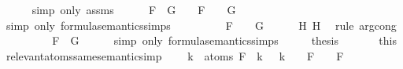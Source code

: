 \begin{isabellebody}
\ \ \ \ \isamarkupfalse%
\ {\isacharparenleft}simp\ only{\isacharcolon}\ assms{\isacharparenleft}{}{\isacharparenright}{\isacharparenright}\isanewline
\ \ \isamarkupfalse%
\ {\isachardoublequoteopen}{\isasymA}\ {\isasymTurnstile}\ F\ \isactrlbold {\isasymor}\ G\ {\isacharequal}\ {\isacharparenleft}{\isasymA}\ {\isasymTurnstile}\ F\ {\isasymor}\ {\isasymA}\ {\isasymTurnstile}\ G{\isacharparenright}{\isachardoublequoteclose}\isanewline
\ \ \ \ \isamarkupfalse%
\ {\isacharparenleft}simp\ only{\isacharcolon}\ formula{\isacharunderscore}semantics{\isachardot}simps{\isacharparenleft}{}{\isacharparenright}{\isacharparenright}\isanewline
\ \ \isamarkupfalse%
\ \isamarkupfalse%
\ {\isachardoublequoteopen}{\isasymdots}\ {\isacharequal}\ {\isacharparenleft}{\isasymA}\ {\isasymTurnstile}\ F\ {\isasymor}\ {\isasymA}\ {\isasymTurnstile}\ G{\isacharparenright}{\isachardoublequoteclose}\isanewline
\ \ \ \ \isamarkupfalse%
\ H{}\ H{}\ \isamarkupfalse%
\ {\isacharparenleft}rule\ arg{\isacharunderscore}cong{}{\isacharparenright}\isanewline
\ \ \isamarkupfalse%
\ \isamarkupfalse%
\ {\isachardoublequoteopen}{\isasymdots}\ {\isacharequal}\ {\isasymA}\ {\isasymTurnstile}\ F\ \isactrlbold {\isasymor}\ G{\isachardoublequoteclose}\isanewline
\ \ \ \ \isamarkupfalse%
\ {\isacharparenleft}simp\ only{\isacharcolon}\ formula{\isacharunderscore}semantics{\isachardot}simps{\isacharparenleft}{}{\isacharparenright}{\isacharparenright}\isanewline
\ \ \isamarkupfalse%
\ \isamarkupfalse%
\ {\isacharquery}thesis\ \isanewline
\ \ \ \ \isamarkupfalse%
\ this\isanewline
{}\isamarkupfalse%
%
\endisatagproof
{\isafoldproof}%
%
\isadelimproof
\isanewline
%
\endisadelimproof
\isanewline
{}\isamarkupfalse%
\ relevant{\isacharunderscore}atoms{\isacharunderscore}same{\isacharunderscore}semantics{\isacharunderscore}imp{\isacharcolon}\ \isanewline
\ \ \ {\isachardoublequoteopen}{\isasymforall}k\ {\isasymin}\ atoms\ F{\isachardot}\ {\isasymA}\ k\ {\isacharequal}\ {\isasymA}\ k\ {\isasymLongrightarrow}\ {\isasymA}\ {\isasymTurnstile}\ F\ {\isasymlongleftrightarrow}\ {\isasymA}\ {\isasymTurnstile}\ F{\isachardoublequoteclose}\isanewline

\end{isabellebody}
